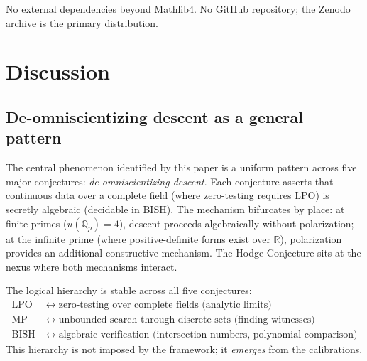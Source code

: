 \documentclass[11pt]{article}
\theoremstyle{definition}
\theoremstyle{remark}
\newcommand{\Q}{\mathbb{Q}}
\newcommand{\R}{\mathbb{R}}
\newcommand{\Qp}{\Q_p}
\newcommand{\LPO}{\mathrm{LPO}}
\newcommand{\MP}{\mathrm{MP}}
\newcommand{\BISH}{\mathrm{BISH}}
\begin{document}
\noindent No external dependencies beyond Mathlib4. No GitHub repository; the Zenodo archive is the primary distribution.

\section{Discussion}
\label{sec:discuss}

\subsection{De-omniscientizing descent as a general pattern}

The central phenomenon identified by this paper is a uniform pattern across five major conjectures: \emph{de-omniscientizing descent}. Each conjecture asserts that continuous data over a complete field (where zero-testing requires $\LPO$) is secretly algebraic (decidable in $\BISH$). The mechanism bifurcates by place: at finite primes ($u(\Qp) = 4$), descent proceeds algebraically without polarization; at the infinite prime (where positive-definite forms exist over $\R$), polarization provides an additional constructive mechanism. The Hodge Conjecture sits at the nexus where both mechanisms interact.

The logical hierarchy is stable across all five conjectures:
\begin{align*}
\LPO &\;\leftrightarrow\; \text{zero-testing over complete fields (analytic limits)} \\
\MP &\;\leftrightarrow\; \text{unbounded search through discrete sets (finding witnesses)} \\
\BISH &\;\leftrightarrow\; \text{algebraic verification (intersection numbers, polynomial comparison)}
\end{align*}
This hierarchy is not imposed by the framework; it \emph{emerges} from the calibrations.
\end{document}
